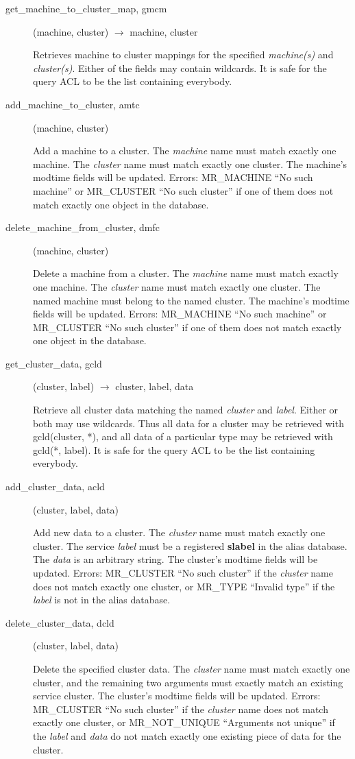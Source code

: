 \documentclass{article}
\begin{document}
\begin{description}
\item[get\_machine\_to\_cluster\_map, gmcm](machine, cluster)
$\rightarrow$ machine, cluster

Retrieves machine to cluster mappings for the specified {\em
machine(s)\/} and {\em cluster(s)}. Either of the fields may contain
wildcards. It is safe for the query ACL to be the list containing
everybody.

\item[add\_machine\_to\_cluster, amtc](machine, cluster)

Add a machine to a cluster.  The {\em machine} name must match exactly
one machine.  The {\em cluster} name must match exactly one cluster.
The machine's modtime fields will be updated.  Errors: MR\_MACHINE ``No
such machine'' or MR\_CLUSTER ``No such cluster'' if one of them does not
match exactly one object in the database.

\item[delete\_machine\_from\_cluster, dmfc](machine, cluster)

Delete a machine from a cluster.  The {\em machine} name must match
exactly one machine.  The {\em cluster} name must match exactly one
cluster.  The named machine must belong to the named cluster.  The
machine's modtime fields will be updated.  Errors: MR\_MACHINE ``No
such machine'' or MR\_CLUSTER ``No such cluster'' if one of them does not
match exactly one object in the database.

\item[get\_cluster\_data, gcld](cluster, label) $\rightarrow$ cluster, label,
data

Retrieve all cluster data matching the named {\em cluster} and {\em label}.
Either or both may use wildcards.  Thus all data for a cluster may be
retrieved with gcld(cluster, *), and all data of a particular type may
be retrieved with gcld(*, label).  It is safe for the query ACL to be
the list containing everybody.

\item[add\_cluster\_data, acld](cluster, label, data)

Add new data to a cluster.  The {\em cluster} name must match exactly
one cluster.  The service {\em label} must be a registered {\bf slabel} in
the alias database.  The {\em data} is an arbitrary string.  The
cluster's modtime fields will be updated.  Errors: MR\_CLUSTER ``No
such cluster'' if the {\em cluster} name does not match exactly one
cluster, or MR\_TYPE ``Invalid type'' if the {\em label} is not in the
alias database.

\item[delete\_cluster\_data, dcld](cluster, label, data)

Delete the specified cluster data.  The {\em cluster} name must match
exactly one cluster, and the remaining two arguments must exactly
match an existing service cluster.  The cluster's modtime fields will
be updated.  Errors: MR\_CLUSTER ``No such cluster'' if the {\em cluster}
name does not match exactly one cluster, or MR\_NOT\_UNIQUE ``Arguments
not unique'' if the {\em label} and {\em data} do not match exactly one
existing piece of data for the cluster.

\end{description}
\end{document}
